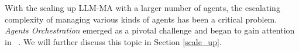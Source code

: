 {With the scaling up LLM-MA with  a larger  number of agents,  the escalating complexity of managing various kinds of agents has been a critical problem. \emph{Agents Orchestration} emerged as a pivotal challenge and began to gain attention in ~\cite{multiorches1,multiorches2}. We will further discuss this topic in Section \ref{scale_up}.}



% 









